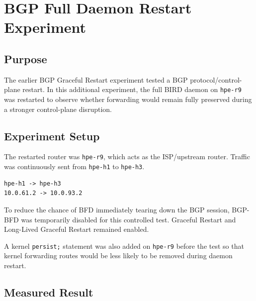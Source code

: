 \section{BGP Full Daemon Restart Experiment}

\subsection{Purpose}

The earlier BGP Graceful Restart experiment tested a BGP protocol/control-plane restart. In this additional experiment, the full BIRD daemon on \texttt{hpe-r9} was restarted to observe whether forwarding would remain fully preserved during a stronger control-plane disruption.

\subsection{Experiment Setup}

The restarted router was \texttt{hpe-r9}, which acts as the ISP/upstream router. Traffic was continuously sent from \texttt{hpe-h1} to \texttt{hpe-h3}.

\begin{verbatim}
hpe-h1 -> hpe-h3
10.0.61.2 -> 10.0.93.2
\end{verbatim}

To reduce the chance of BFD immediately tearing down the BGP session, BGP-BFD was temporarily disabled for this controlled test. Graceful Restart and Long-Lived Graceful Restart remained enabled.

A kernel \texttt{persist;} statement was also added on \texttt{hpe-r9} before the test so that kernel forwarding routes would be less likely to be removed during daemon restart.

\subsection{Measured Result}

